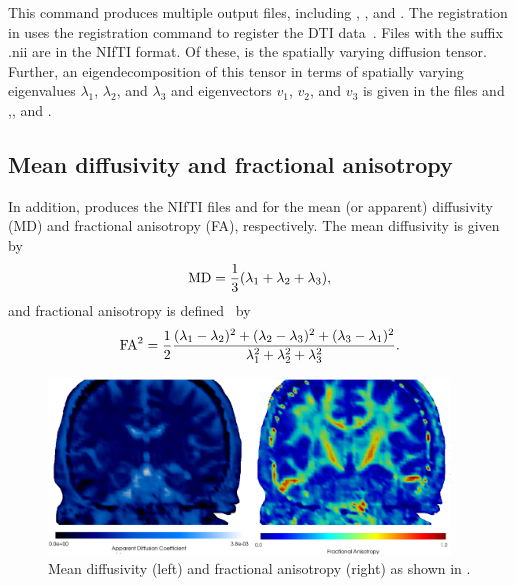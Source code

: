 This command produces multiple output files, including
, , and . The
registration in  uses the registration command
 to register the DTI
data~\cite{freesurfer-wiki}. Files with the suffix .nii are in the
NIfTI format. Of these,  is the spatially varying
diffusion tensor. Further, an eigendecomposition of this tensor in
terms of spatially varying eigenvalues $\lambda_1$, $\lambda_2$, and 
$\lambda_3$ and eigenvectors $v_1$, $v_2$, and $v_3$ is given in the files
 and ,,
and .


\subsection{Mean diffusivity and fractional anisotropy}
In addition,  produces the NIfTI files
 and  for the mean (or apparent)
diffusivity (MD) and fractional anisotropy (FA), respectively. 
The mean diffusivity is given by 
\begin{equation}
  \rm{MD} = \frac{1}{3}(\lambda_1 + \lambda_2 + \lambda_3),   
\end{equation}
and  fractional
anisotropy is defined~\cite{kindlmann2007geodesic} by
\begin{equation}\label{eqn:chp5:fa}
	\rm{FA}^2 = \frac{1}{2} \frac{(\lambda_1-\lambda_2)^2 
+ (\lambda_2 - \lambda_3)^2 + (\lambda_3 - \lambda_1)^2}{\lambda_1^2 
+ \lambda_2^2 + \lambda_3^2} .  
\end{equation}
\begin{figure}	
  \begin{center}
    \includegraphics[width=0.95\textwidth]{./graphics/chp5/paraview_adcfa.png}
  \end{center}
  \caption{Mean diffusivity (left) and fractional anisotropy (right) as shown in .}
  \label{fig:chp5:DTIfa}
\end{figure}
